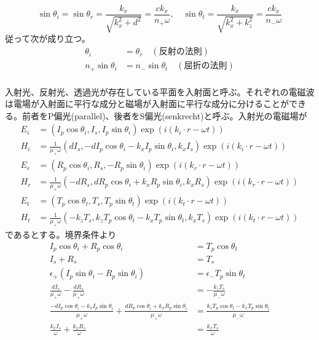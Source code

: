         \[\sin\theta_i = \sin\theta_r = \frac{k_x}{\sqrt{k_x^2 + d^2}} = \frac{ck_x}{n_+\omega}, \quad \sin\theta_t = \frac{k_x}{\sqrt{k_x^2 + k_z^2}} = \frac{ck_x}{n_-\omega}\]
    従って次が成り立つ。
    \begin{align*}
        \theta_i &= \theta_r \quad (反射の法則)\\
        n_+\sin\theta_i &= n_-\sin\theta_t \quad (屈折の法則)\\
    \end{align*}

    入射光、反射光、透過光が存在している平面を入射面と呼ぶ。それぞれの電磁波は電場が入射面に平行な成分と磁場が入射面に平行な成分に分けることができる。前者をP偏光(parallel)、後者をS偏光(senkrecht)と呼ぶ。入射光の電磁場が
    \begin{align*}
        E_i &= (I_p\cos\theta_i, I_s, I_p\sin\theta_i)\exp(i(k_i \cdot r - \omega t))\\
        H_i &= \frac{1}{\mu_+\omega}(dI_s, -dI_p\cos\theta_i - k_xI_p\sin\theta_i, k_xI_s)\exp(i(k_i \cdot r - \omega t))\\
        E_r &= (R_p\cos\theta_i, R_s, -R_p\sin\theta_i)\exp(i(k_r \cdot r - \omega t))\\
        H_r &= \frac{1}{\mu_+\omega}(-dR_s, dR_p\cos\theta_i + k_xR_p\sin\theta_i, k_xR_s)\exp(i(k_r \cdot r - \omega t))\\
        E_t &= (T_p\cos\theta_t, T_s, T_p\sin\theta_t)\exp(i(k_t \cdot r - \omega t))\\
        H_t &= \frac{1}{\mu_+\omega}(-k_zT_s, k_zT_p\cos\theta_t - k_xT_p\sin\theta_t, k_xT_s)\exp(i(k_t \cdot r - \omega t))
    \end{align*}
    であるとする。境界条件より
    \begin{align*}
        I_p\cos\theta_i + R_p\cos\theta_i &= T_p\cos\theta_t\\
        I_s + R_s &= T_s\\
        \epsilon_+(I_p\sin\theta_i - R_p\sin\theta_i) &= \epsilon_-T_p\sin\theta_t\\
        \frac{dI_s}{\mu_+\omega} - \frac{dR_s}{\mu_+\omega} &= -\frac{k_zT_s}{\mu_-\omega}\\
        \frac{-dI_p\cos\theta_i - k_xI_p\sin\theta_i}{\mu_+\omega} + \frac{dR_p\cos\theta_i + k_xR_p\sin\theta_i}{\mu_+\omega} &= \frac{k_zT_p\cos\theta_t - k_xT_p\sin\theta_t}{\mu_-\omega}\\
        \frac{k_xI_s}{\omega} + \frac{k_xR_s}{\omega} &= \frac{k_xT_s}{\omega}
    \end{align*}
